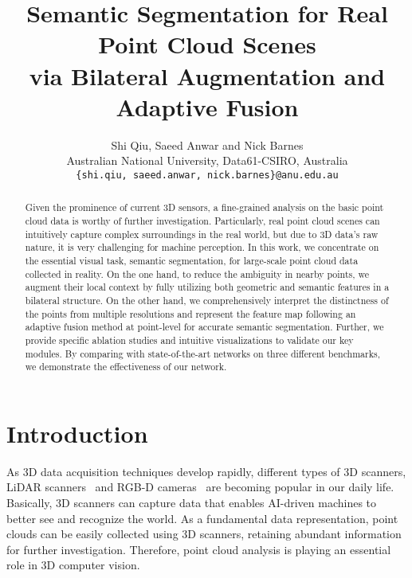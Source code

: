 \documentclass[10pt,twocolumn,letterpaper]{article}
\begin{document}
\title{Semantic Segmentation for Real Point Cloud Scenes \\via Bilateral Augmentation and Adaptive Fusion}

\author{Shi Qiu, Saeed Anwar and Nick Barnes\\
Australian National University, Data61-CSIRO, Australia\\
{\tt\small \{shi.qiu, saeed.anwar, nick.barnes\}@anu.edu.au}
}

\maketitle


\begin{abstract}
Given the prominence of current 3D sensors, a fine-grained analysis on the basic point cloud data is worthy of further investigation. Particularly, real point cloud scenes can intuitively capture complex surroundings in the real world, but due to 3D data's raw nature, it is very challenging for machine perception. In this work, we concentrate on the essential visual task, semantic segmentation, for large-scale point cloud data collected in reality. On the one hand, to reduce the ambiguity in nearby points, we augment their local context by fully utilizing both geometric and semantic features in a bilateral structure. On the other hand, we comprehensively interpret the distinctness of the points from multiple resolutions and represent the feature map following an adaptive fusion method at point-level for accurate semantic segmentation. Further, we provide specific ablation studies and intuitive visualizations to validate our key modules. By comparing with state-of-the-art networks on three different benchmarks, we demonstrate the effectiveness of our network.
\end{abstract}

\section{Introduction}

As 3D data acquisition techniques develop rapidly, different types of 3D scanners, \eg LiDAR scanners~\cite{jaboyedoff2012use} and RGB-D cameras~\cite{endres20133} are becoming popular in our daily life. Basically, 3D scanners can capture data that enables AI-driven machines to better see and recognize the world. As a fundamental data representation, point clouds can be easily collected using 3D scanners, retaining abundant information for further investigation. Therefore, point cloud analysis is playing an essential role in 3D computer vision. 
\end{document}
